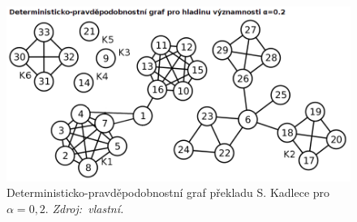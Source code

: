 \documentclass[dp.tex]{subfiles}
\begin{document}
\begin{figure}[p]
	\includegraphics[max width=\textwidth,keepaspectratio=true]{imgs-99-priloha-d/o_d_20}
	\caption[Deterministicko-pravděpodobnostní graf překladu S. Kadlece pro $\alpha = 0{,}2$]
	{Deterministicko-pravděpodobnostní graf překladu S. Kadlece pro $\alpha = 0{,}2$. \textit{Zdroj:~vlastní.}}
	\label{fig:o_d_20}
\end{figure}


\end{document}
